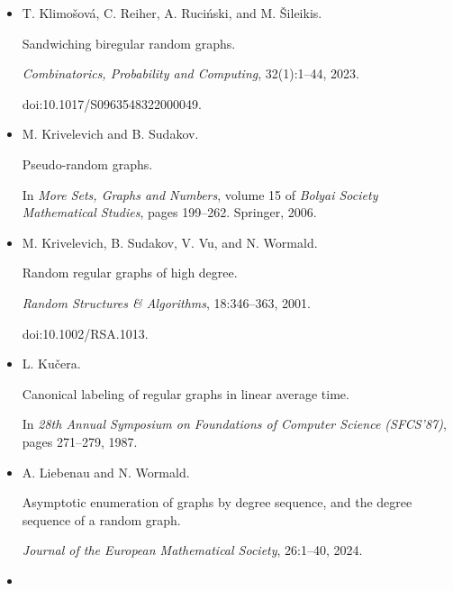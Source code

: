 \documentclass[10pt,a4paper]{article}
\begin{document}
\begin{itemize}
\item[] 
[34]

T. Klimošová, C. Reiher, A. Ruciński, and M. Šileikis.


Sandwiching biregular random graphs.


\emph{Combinatorics, Probability and Computing}, 32(1):1–44, 2023.


doi:10.1017/S0963548322000049.





\item[] 
[35]

M. Krivelevich and B. Sudakov.


Pseudo-random graphs.


In \emph{More Sets, Graphs and Numbers}, volume 15 of \emph{Bolyai
Society Mathematical Studies}, pages 199–262. Springer, 2006.





\item[] 
[36]

M. Krivelevich, B. Sudakov, V. Vu, and N. Wormald.


Random regular graphs of high degree.


\emph{Random Structures \& Algorithms}, 18:346–363, 2001.


doi:10.1002/RSA.1013.





\item[] 
[37]

L. Kučera.


Canonical labeling of regular graphs in linear average time.


In \emph{28th Annual Symposium on Foundations of Computer Science
(SFCS’87)}, pages 271–279, 1987.





\item[] 
[38]

A. Liebenau and N. Wormald.


Asymptotic enumeration of graphs by degree sequence, and the degree
sequence of a random graph.


\emph{Journal of the European Mathematical Society}, 26:1–40, 2024.





\item[] 
[39]


\end{itemize}
\end{document}
